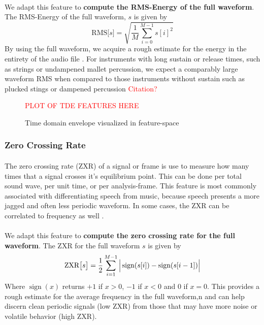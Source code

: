 \documentclass[12pt,letterpaper]{article}
\DeclareMathOperator{\sign}{\text{sign}}
\begin{document}
\paragraph*{}We adapt this feature to \textbf{compute the RMS-Energy of the full waveform}. The RMS-Energy of the full waveform, $s$ is given by \cite{Olsen,Serizel}
\begin{equation}
\label{eqn-RMS}
\text{RMS}\big[ s \big] = \sqrt{\frac{1}{M} \sum_{i=0}^{M-1} s[i]^2}
\end{equation}
By using the full waveform, we acquire a rough estimate for the energy in the entirety of the audio file \cite{Liu}. For instruments with long sustain or release times, such as strings or undampened mallet percussion, we expect a comparably large waveform RMS when compared to those instruments without sustain such as plucked stings or dampened percussion  \textcolor{red}{Citation?}

\begin{figure}[H]
\begin{center}
\textcolor{red}{PLOT OF TDE FEATURES HERE}
\end{center}
\caption{Time domain envelope visualized in feature-space}
\label{fig-FeatureTDE}
\end{figure}


\subsubsection{Zero Crossing Rate}

\paragraph*{}The zero crossing rate (ZXR) of a signal or frame is use to measure how many times that a signal crosses it's equilibrium point. This can be done per total sound wave, per unit time, or per analysis-frame. This feature is most commonly associated with differentiating speech from music, because speech presents a more jagged and often less periodic waveform. In some cases, the ZXR can be correlated to frequency as well \cite{Kahn,Zhang}. 

\paragraph*{}We adapt this feature to \textbf{compute the zero crossing rate for the full waveform}. The ZXR for the full waveform $s$ is given by \cite{Serizel,Liu}
\begin{equation}
\label{eqn-ZXR}
\text{ZXR}\big[ s \big] = \frac{1}{2} \sum_{i=1}^{M-1} \Big{|} \sign(s[i]) - \sign(s[i-1]) \Big{|} 
\end{equation}
Where $\sign(x)$ returns $+1$ if $x > 0$, $-1$ if $x < 0$ and $0$ if $x = 0$. This provides a rough estimate for the average frequency in the full waveform,n and can help discern clean periodic signals (low ZXR) from those that may have more noise or volatile behavior (high ZXR)\cite{Serizel}.
\end{document}

